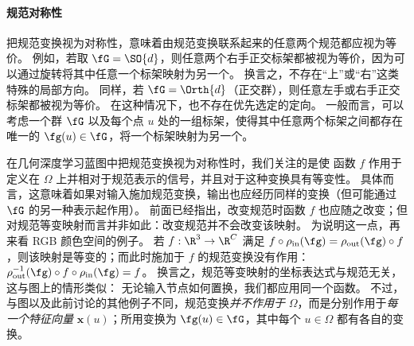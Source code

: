 

\paragraph{规范对称性}
把规范变换视为对称性，意味着由规范变换联系起来的任意两个规范都应视为等价。%
例如，若取 $\fG = \SO{d}$，则任意两个右手正交标架都被视为等价，因为可以通过旋转将其中任意一个标架映射为另一个。
换言之，不存在“上”或“右”这类特殊的局部方向。
同样，若 $\fG = \Orth{d}$（正交群），则任意左手或右手正交标架都被视为等价。
在这种情况下，也不存在优先选定的定向。
%
%
%
一般而言，可以考虑一个群 $\fG$ %
以及每个点 $u$ 处的一组标架，使得其中任意两个标架之间都存在唯一的 $\fg(u) \in \fG$，将一个标架映射为另一个。
%


在几何深度学习蓝图中把规范变换视为对称性时，我们关注的是使
函数 $f$ 作用于定义在 $\Omega$ 上并相对于规范表示的信号，并且对于这种变换具有等变性。
%
具体而言，这意味着如果对输入施加规范变换，输出也应经历同样的变换（但可能通过 $\fG$ 的另一种表示起作用）。
前面已经指出，改变规范时函数 $f$ 也应随之改变；但对规范等变映射而言并非如此：改变规范并不会改变该映射。
为说明这一点，再来看 RGB 颜色空间的例子。
若 $f : \R^3 \rightarrow \R^C$ 满足 $f \circ \rho_{\textup{in}}(\fg) = \rho_{\textup{out}}(\fg) \circ f$，则该映射是等变的；而此时施加于 $f$ 的规范变换没有作用：$\rho_{\textup{out}}^{-1}(\fg) \circ f \circ \rho_{\textup{in}}(\fg) = f$。
换言之，规范等变映射的坐标表达式与规范无关，这与图上的情形类似：
无论输入节点如何置换，我们都应用同一个函数。
%
不过，与图以及此前讨论的其他例子不同，规范变换{\em 并不作用于} $\Omega$，而是分别作用于{\em 每一个特征向量} $\mathbf{x}(u)$；所用变换为 $\fg(u) \in \fG$，其中每个 $u \in \Omega$ 都有各自的变换。

